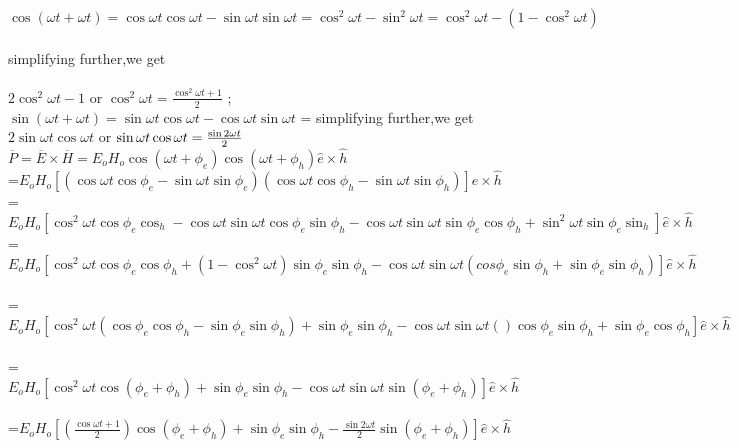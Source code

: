 		$ \cos(\omega t+\omega t) =\cos\omega t\cos\omega t-\sin\omega t\sin\omega t =\cos^{2}\omega t-\sin^{2}\omega t=\cos^{2}\omega t-(1-\cos^{2}\omega t)$\\\\
		simplifying further,we get\\\\
		$ 2\cos^{2}\omega t-1 $ or $ \cos^{2}\omega t=\frac{\cos^{2}\omega t+1}{2} $ ;\\
		$ \sin(\omega t+\omega t) =\sin\omega t\cos\omega t-\cos\omega t\sin\omega t$ =
		simplifying further,we get\\
		$ 2\sin\omega t\cos\omega t$ or $  \sin\omega t\cos\omega t = \frac{\sin2\omega t}{2} \\
		$\\
$\overline{P}= \overline{E}\times\overline{H}=E_{o}H_{o}\cos(\omega t+\phi_{e})\cos(\omega t+\phi_{h})\hat{e}\times\hat{h} $\\
=$ E_{o}H_{o}[(\cos\omega t\cos\phi_{e}-\sin\omega t\sin\phi_{e})(\cos\omega t\cos\phi_{h}-\sin\omega t\sin\phi_{h})]\hat{e}\times\hat{h} $\\
= $ E_{o}H_{o}[\cos^{2}\omega t\cos\phi_{e}\cos_{h}-\cos\omega t\sin\omega t\cos\phi_{e}\sin\phi_{h}-\cos\omega t\sin\omega t\sin\phi_{e}\cos\phi_{h}+\sin^{2}\omega t\sin\phi_{e}\sin_{h}]\hat{e}\times\hat{h}$\\
=$E_{o}H_{o}[\cos^{2}\omega t\cos\phi_{e}\cos\phi_{h}+ ( 1 - \cos^{2}\omega t)\sin\phi_{e}\sin\phi_{h} -\cos\omega t\sin\omega t(cos\phi_{e}\sin\phi_{h} +\sin \phi_{e}\sin\phi_{h})]\hat{e}\times\hat{h} $\\\\
=$E_{o}H_{o}[\cos^{2}\omega t(\cos\phi_{e}\cos\phi_{h}-\sin\phi_{e}\sin\phi_{h})+\sin\phi_{e}\sin\phi_{h}-\cos\omega t\sin\omega t()\cos\phi_{e}\sin\phi_{h}+\sin\phi_{e}\cos\phi_{h}] \hat{e}\times\hat{h} $\\\\=   $ E_{o}H_{o}[\cos^{2}\omega t\cos(\phi_{e}+\phi_{h})+\sin\phi_{e}\sin\phi_{h}-\cos\omega t\sin\omega t\sin(\phi_{e}+\phi_{h})      ]\hat{e}\times\hat{h} $ \\\\
=$E_{o}H_{o} [(\frac{\cos\omega t+1}{2})\cos(\phi_{e}+\phi_{h})+\sin\phi_{e}\sin\phi_{h}-\frac{\sin2\omega t}{2}\sin(\phi_{e}+\phi_{h})] \hat{e}\times\hat{h}  $\\\\
